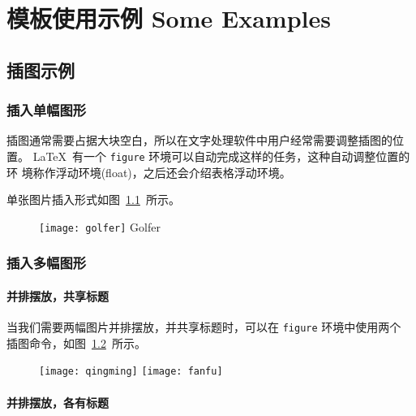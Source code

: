 \chapter{模板使用示例 Some Examples}
\label{cha:examples}

\section{插图示例}
\label{sec:figure}

\subsection{插入单幅图形}

插图通常需要占据大块空白，所以在文字处理软件中用户经常需要调整插图的位置。
\LaTeX~有一个 \texttt{figure} 环境可以自动完成这样的任务，这种自动调整位置的环
境称作浮动环境(float)，之后还会介绍表格浮动环境。

单张图片插入形式如图~\ref{fig:golfer}~所示。
\begin{figure}[htbp]
\centering
\texttt{[image: golfer]}
          {Golfer}
\label{fig:golfer}
\end{figure}

\subsection{插入多幅图形}

\subsubsection*{并排摆放，共享标题}

当我们需要两幅图片并排摆放，并共享标题时，可以在 \texttt{figure} 环境中使用两个
插图命令，如图~\ref{fig:fanqingfuming}~所示。

\begin{figure}[htbp]
\centering
\texttt{[image: qingming]}
\hspace{36pt}
\texttt{[image: fanfu]}
\label{fig:fanqingfuming}
\end{figure}

\subsubsection*{并排摆放，各有标题}

